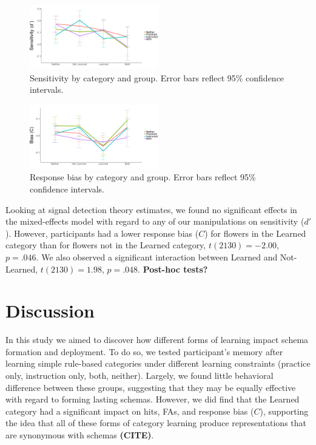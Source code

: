 \documentclass[twocolumn]{svjour3}          %
\begin{document}
\begin{figure}
  \includegraphics[width=0.5\textwidth]{E6_sensitivity.png}
  \caption{Sensitivity by category and group. Error bars reflect 95\%
    confidence intervals.}
  \label{fig:sensitivity}
\end{figure}
\begin{figure}
  \includegraphics[width=0.5\textwidth]{E6_bias.png}
  \caption{Response bias by category and group. Error bars reflect
    95\% confidence intervals.}
  \label{fig:bias}
\end{figure}

Looking at signal detection theory estimates, we found no significant
effects in the mixed-effects model with regard to any of our
manipulations on sensitivity ($d'$). However, participants had a lower
response bias ($C$) for flowers in the Learned category than for
flowers not in the Learned category, $t(2130) = -2.00$, $p = .046$. We
also observed a significant interaction between Learned and
Not-Learned, $t(2130) = 1.98$, $p = .048$. \textbf{Post-hoc tests?}

\section*{Discussion}
\label{discussion}
In this study we aimed to discover how different forms of learning
impact schema formation and deployment. To do so, we tested
participant's memory after learning simple rule-based categories under
different learning constraints (practice only, instruction only, both,
neither). Largely, we found little behavioral difference between these
groups, suggesting that they may be equally effective with regard to
forming lasting schemas. However, we did find that the Learned
category had a significant impact on hits, FAs, and response bias
($C$), supporting the idea that all of these forms of category
learning produce representations that are synonymous with schemas
\textbf{(CITE)}.
\end{document}
